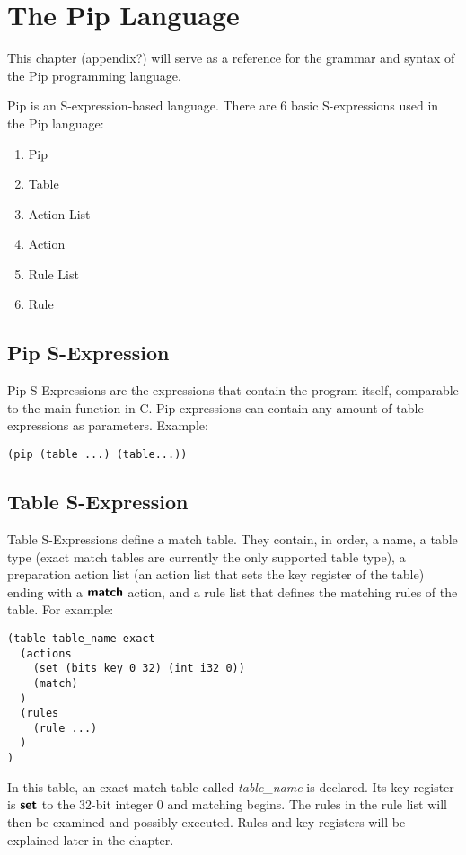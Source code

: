 \section{The Pip Language}
This chapter (appendix?) will serve as a reference for the grammar and syntax of the Pip programming language.

Pip is an S-expression-based language. There are 6 basic S-expressions used in the Pip language:
\begin{enumerate}
  \item Pip
  \item Table
  \item Action List
  \item Action
  \item Rule List
  \item Rule
\end{enumerate}

\subsection{Pip S-Expression}
Pip S-Expressions are the expressions that contain the program itself, comparable to the main function in C. Pip expressions can contain any amount of table expressions as parameters. Example:
\begin{mdframed}
\begin{verbatim}
(pip (table ...) (table...))
\end{verbatim}
\end{mdframed}

\subsection{Table S-Expression}
Table S-Expressions define a match table. They contain, in order, a name, a table type (exact match tables are currently the only supported table type), a preparation action list (an action list that sets the key register of the table) ending with a $\bm{\mathsf{{match}}}$ action, and a rule list that defines the matching rules of the table. For example:
\begin{mdframed}
\begin{verbatim}
(table table_name exact
  (actions
    (set (bits key 0 32) (int i32 0))
    (match)
  )
  (rules
    (rule ...)
  )
)
\end{verbatim}
\end{mdframed}
In this table, an exact-match table called \textit{table\_name} is declared. Its key register is $\bm{\mathsf{{set}}}$ to the 32-bit integer 0 and matching begins. The rules in the rule list will then be examined and possibly executed. Rules and key registers will be explained later in the chapter.

